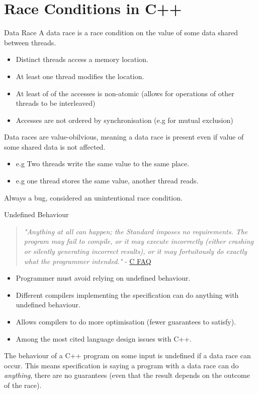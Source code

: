 \section{Race Conditions in C++}
\begin{definitionbox}{Data Race}
    A data race is a race condition on the value of some data shared between threads.
    \begin{itemize}
      \item Distinct threads access a memory location.
      \item At least one thread modifies the location.
      \item At least of of the accesses is non-atomic (allows for operations of other threads to be interleaved)
      \item Accesses are not ordered by synchronisation (e.g for mutual exclusion)
    \end{itemize}
    Data races are value-obilvious, meaning a data race is present even if value of some shared data is not affected.
    \begin{itemize}
      \item e.g Two threads write the same value to the same place.
      \item e.g one thread stores the same value, another thread reads. 
    \end{itemize}
    Always a bug, considered an unintentional race condition.
\end{definitionbox}
\begin{definitionbox}{Undefined Behaviour}
  \begin{quote}
    \textit{"Anything at all can happen; the Standard imposes no requirements. The program 
    may fail to compile, or it may execute incorrectly (either crashing or silently 
    generating incorrect results), or it may fortuitously do exactly what the programmer 
    intended."} - \href{https://c-faq.com/ansi/undef.html}{C FAQ}
  \end{quote}
  \begin{itemize}
    \item Programmer must avoid relying on undefined behaviour.
    \item Different compilers implementing the specification can do anything with undefined behaviour.
    \item Allows compilers to do more optimisation (fewer guarantees to satisfy).
    \item Among the most cited language design issues with C++.
  \end{itemize}
  The behaviour of a C++ program on some input is undefined if a data race can occur. This means
  specification is saying a program with a data race can do \textit{anything}, there are no guarantees (even that the result depends on the outcome of the race).
\end{definitionbox}

